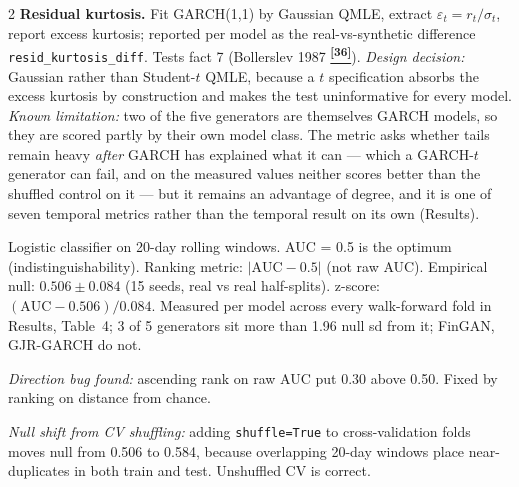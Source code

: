 \documentclass[10pt]{article}
\newcommand{\tealbox}[2]{\begin{tcolorbox}[mybox={Teal}{LBg},title={#1}]#2\end{tcolorbox}}
\newcommand{\tcite}[1]{%
  \hyperlink{R:#1}{\textsuperscript{\scriptsize\textbf{[#1]}}}}
\begin{document}
\begin{multicols}{2}
{\textbf{Residual kurtosis.} Fit GARCH(1,1) by Gaussian QMLE, extract $\varepsilon_t = r_t/\sigma_t$, report excess kurtosis; reported per model as the real-vs-synthetic difference \texttt{resid\_kurtosis\_diff}. Tests fact 7 (Bollerslev 1987\tcite{36}). \textit{Design decision:} Gaussian rather than Student-$t$ QMLE, because a $t$ specification absorbs the excess kurtosis by construction and makes the test uninformative for every model. \textit{Known limitation:} two of the five generators are themselves GARCH models, so they are scored partly by their own model class. The metric asks whether tails remain heavy \emph{after} GARCH has explained what it can --- which a GARCH-$t$ generator can fail, and on the measured values neither scores better than the shuffled control on it --- but it remains an advantage of degree, and it is one of seven temporal metrics rather than the temporal result on its own (Results).}

\tealbox{Temporal Group: Discriminative AUC}{%
Logistic classifier on 20-day rolling windows. AUC = 0.5 is the optimum (indistinguishability). Ranking metric: $|\text{AUC} - 0.5|$ (not raw AUC). Empirical null: $0.506 \pm 0.084$ (15 seeds, real vs real half-splits). z-score: $(\text{AUC} - 0.506)/0.084$. Measured per model across every walk-forward fold in Results, Table~4; 3 of 5 generators sit more than 1.96 null sd from it; FinGAN, GJR-GARCH do not.

\textit{Direction bug found:} ascending rank on raw AUC put 0.30 above 0.50. Fixed by ranking on distance from chance.

\textit{Null shift from CV shuffling:} adding \texttt{shuffle=True} to cross-validation folds moves null from 0.506 to 0.584, because overlapping 20-day windows place near-duplicates in both train and test. Unshuffled CV is correct.}

\end{multicols}
\end{document}
